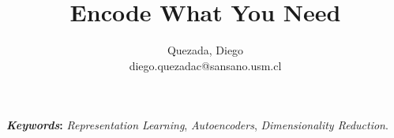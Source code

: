 \documentclass[twocolumn]{article}
\title{\textbf{Encode What You Need}}
\author{Quezada, Diego \\ diego.quezadac@sansano.usm.cl}
\begin{document}
\sloppy %

\maketitle



\textbf{\textit{Keywords}:}  \textit{Representation Learning}, \textit{Autoencoders}, \textit{Dimensionality Reduction}.













\newpage


\end{document}
